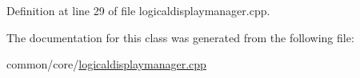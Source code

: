 Definition at line 29 of file logicaldisplaymanager.\+cpp.


\begin{DoxyCode}{0}
\end{DoxyCode}


The documentation for this class was generated from the following file\+:\begin{DoxyCompactItemize}
\item 
common/core/\mbox{\hyperlink{logicaldisplaymanager_8cpp}{logicaldisplaymanager.\+cpp}}\end{DoxyCompactItemize}
